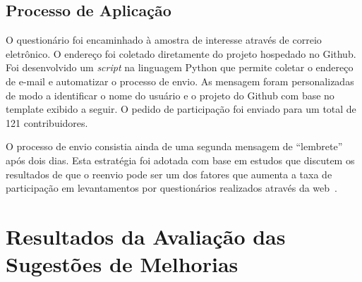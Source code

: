 \subsection{Processo de Aplicação}
\label{ssub:processo_de_aplicação}

O questionário foi encaminhado à amostra de interesse através de correio
eletrônico. O endereço foi coletado diretamente do projeto hospedado no Github.
Foi desenvolvido um \textit{script} na linguagem Python que permite coletar o
endereço de e-mail e automatizar o processo de envio. As mensagem foram
personalizadas de modo a identificar o nome do usuário e o projeto do Github com
base no template exibido a seguir. O pedido de participação foi enviado para um
total de 121 contribuidores.







O processo de envio consistia ainda de uma segunda mensagem de ``lembrete'' após
dois dias. Esta estratégia foi adotada com base em estudos que discutem os
resultados de que o reenvio pode ser um dos fatores que aumenta a taxa de
participação em levantamentos por questionários realizados através da
web~\cite{fan2010factors}.

\section{Resultados da Avaliação das Sugestões de Melhorias}
\label{sec:resultados_avaliacao_sug_de_melhorias}

